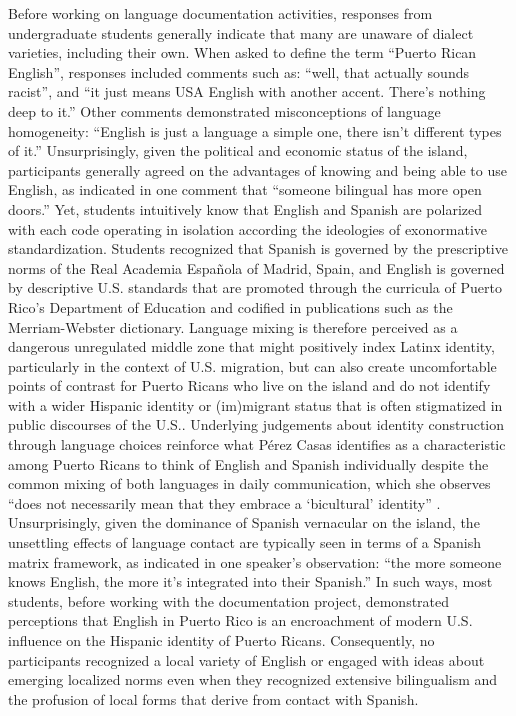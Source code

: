 \documentclass[output=paper,colorlinks,citecolor=brown]{langscibook}
\begin{document}
\begin{sloppypar}
Before working on language documentation activities, responses from undergraduate students generally indicate that many are unaware of dialect varieties, including their own. When asked to define the term “Puerto Rican English”, responses included comments such as: “well, that actually sounds racist”, and “it just means USA English with another accent. There’s nothing deep to it.” Other comments demonstrated misconceptions of language homogeneity: “English is just a language a simple one, there isn’t different types of it.” Unsurprisingly, given the political and economic status of the island, participants generally agreed on the advantages of knowing and being able to use English, as indicated in one comment that “someone bilingual has more open doors.” Yet, students intuitively know that English and Spanish are polarized with each code operating in isolation according the ideologies of exonormative standardization. Students recognized that Spanish is governed by the prescriptive norms of the Real Academia Española of Madrid, Spain, and English is governed by descriptive U.S. standards that are promoted through the curricula of Puerto Rico’s Department of Education and codified in publications such as the Merriam-Webster dictionary. Language mixing is therefore perceived as a dangerous unregulated middle zone that might positively index Latinx identity, particularly in the context of U.S. migration, but can also create uncomfortable points of contrast for Puerto Ricans who live on the island and do not identify with a wider Hispanic identity or (im)migrant status that is often stigmatized in public discourses of the U.S.. Underlying judgements about identity construction through language choices reinforce what Pérez Casas identifies as a characteristic among Puerto Ricans to think of English and Spanish individually despite the common mixing of both languages in daily communication, which she observes “does not necessarily mean that they embrace a ‘bicultural’ identity” \citep[56--57]{PerezCasas_2016}. Unsurprisingly, given the dominance of Spanish vernacular on the island, the unsettling effects of language contact are typically seen in terms of a Spanish matrix framework, as indicated in one speaker’s observation: “the more someone knows English, the more it’s integrated into their Spanish.” In such ways, most students, before working with the documentation project, demonstrated perceptions that English in Puerto Rico is an encroachment of modern U.S. influence on the Hispanic identity of Puerto Ricans. Consequently, no participants recognized a local variety of English or engaged with ideas about emerging localized norms even when they recognized extensive bilingualism and the profusion of local forms that derive from contact with Spanish. 
\end{sloppypar}
\end{document}

